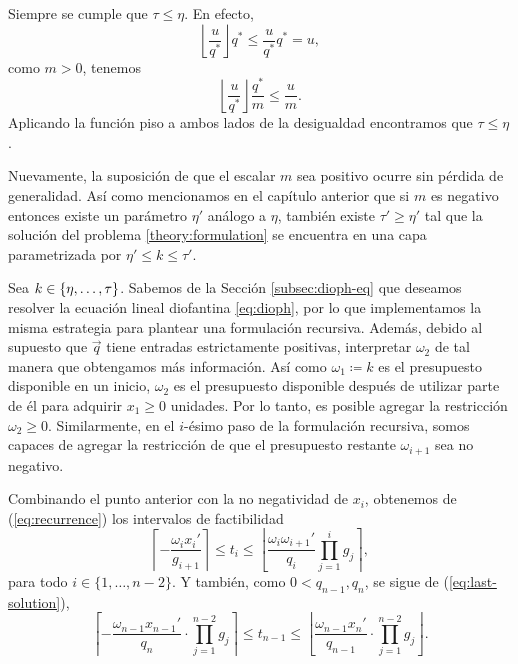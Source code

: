 \begin{observation}
	Siempre se cumple que $\tau \leq \eta$. En efecto,
	\begin{equation*}
		\left\lfloor \frac{u}{q^*} \right\rfloor q^*
		\leq \frac{u}{q^*} q^* = u,
	\end{equation*}
	como $m > 0$, tenemos
	\begin{equation*}
		\left\lfloor \frac{u}{q^*} \right\rfloor \frac{q^*}{m}
		\leq \frac{u}{m}.
	\end{equation*}
	Aplicando la función piso a ambos lados de la desigualdad encontramos que $\tau \leq \eta$.
\end{observation}
\begin{observation}
	Nuevamente, la suposición de que el escalar $m$ sea positivo ocurre sin pérdida de generalidad.
	Así como mencionamos en el capítulo anterior que si $m$ es negativo entonces existe un parámetro
	$\eta'$ análogo a $\eta$, también existe $\tau' \geq \eta'$ tal que la solución del problema
	\eqref{theory:formulation} se encuentra en una capa parametrizada por $\eta' \leq k \leq \tau'$.
\end{observation}

Sea $k \in \lbrace \eta, \ldots, \tau \rbrace$. Sabemos de la Sección \ref{subsec:dioph-eq} que deseamos
resolver la ecuación lineal diofantina \eqref{eq:dioph}, por lo que implementamos la misma
estrategia para plantear una formulación recursiva. Además, debido al supuesto que $\vec{q}$ tiene
entradas estrictamente positivas, interpretar $\omega_2$ de tal manera que obtengamos más
información. Así como $\omega_1 \coloneq k$  es el presupuesto disponible en un inicio, $\omega_2$
es el presupuesto disponible después de utilizar parte de él para adquirir $x_1 \geq 0$ unidades.
Por lo tanto, es posible agregar la restricción $\omega_2 \geq 0$. Similarmente, en el $i$-ésimo
paso de la formulación recursiva, somos capaces de agregar la restricción de que el presupuesto
restante $\omega_{i + 1}$ sea no negativo.

Combinando el punto anterior con la no negatividad de $x_i$, obtenemos de (\ref{eq:recurrence}) los
intervalos de factibilidad
\begin{equation}
	\label{phase-1:finite:eq:param-bounds}
	\left\lceil -\frac{\omega_ix_i'}{g_{i+1}} \right\rceil
	\leq
	t_i
	\leq
	\left\lfloor \frac{\omega_i\omega_{i+1}'}{q_i} \prod_{j=1}^{i}g_j \right\rceil,
\end{equation}
para todo $i \in \lbrace 1, \ldots, n - 2\rbrace$. Y también, como $0 < q_{n - 1}, q_n$, se sigue de
(\ref{eq:last-solution}),
\begin{equation}
	\label{phase-1:finite:eq:param-bounds-last}
	\left\lceil -\frac{\omega_{n-1}x_{n-1}'}{q_n} \cdot \prod_{j=1}^{n-2}g_j \right\rceil
	\leq
	t_{n - 1}
	\leq
	\left\lfloor \frac{\omega_{n-1}x_{n}'}{q_{n-1}} \cdot \prod_{j=1}^{n-2}g_j \right\rfloor.
\end{equation}

